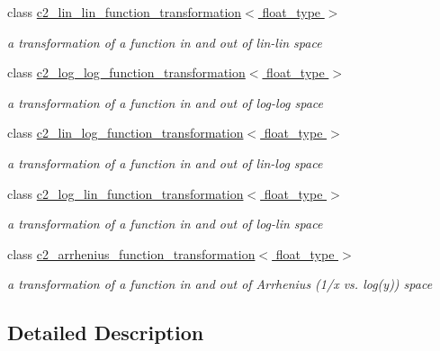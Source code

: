 \begin{DoxyCompactItemize}
class \hyperlink{classc2__lin__lin__function__transformation}{c2\-\_\-lin\-\_\-lin\-\_\-function\-\_\-transformation$<$ float\-\_\-type $>$}
\begin{DoxyCompactList}\small\item\em a transformation of a function in and out of lin-\/lin space \end{DoxyCompactList}\item 
class \hyperlink{classc2__log__log__function__transformation}{c2\-\_\-log\-\_\-log\-\_\-function\-\_\-transformation$<$ float\-\_\-type $>$}
\begin{DoxyCompactList}\small\item\em a transformation of a function in and out of log-\/log space \end{DoxyCompactList}\item 
class \hyperlink{classc2__lin__log__function__transformation}{c2\-\_\-lin\-\_\-log\-\_\-function\-\_\-transformation$<$ float\-\_\-type $>$}
\begin{DoxyCompactList}\small\item\em a transformation of a function in and out of lin-\/log space \end{DoxyCompactList}\item 
class \hyperlink{classc2__log__lin__function__transformation}{c2\-\_\-log\-\_\-lin\-\_\-function\-\_\-transformation$<$ float\-\_\-type $>$}
\begin{DoxyCompactList}\small\item\em a transformation of a function in and out of log-\/lin space \end{DoxyCompactList}\item 
class \hyperlink{classc2__arrhenius__function__transformation}{c2\-\_\-arrhenius\-\_\-function\-\_\-transformation$<$ float\-\_\-type $>$}
\begin{DoxyCompactList}\small\item\em a transformation of a function in and out of Arrhenius (1/x vs. log(y)) space \end{DoxyCompactList}\end{DoxyCompactItemize}


\subsection{Detailed Description}

